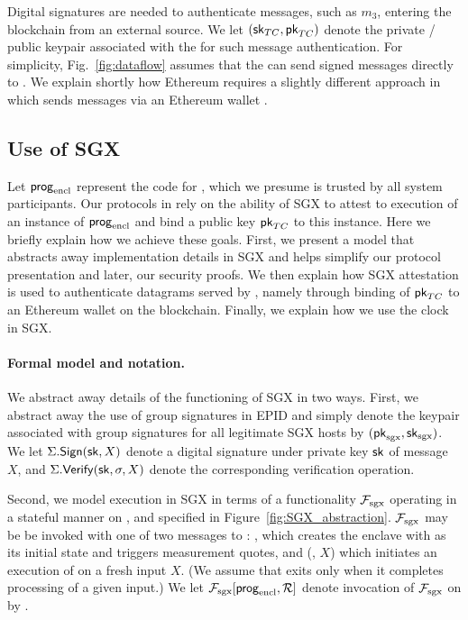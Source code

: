 Digital signatures are needed to authenticate messages, such as $m_3$, entering the blockchain from an external source. We let $({\sf sk}_{TC}, {\sf pk}_{TC})$ denote the private / public keypair associated with the \encname for such message authentication. For simplicity, Fig.~\ref{fig:dataflow} assumes that the \encname can send signed messages directly to \tcont. We explain shortly how Ethereum requires a slightly different approach in which \tc sends messages via an Ethereum wallet \tcadd.


\subsection{Use of SGX}

Let ${\sf prog}_{\textrm{encl}}$ represent the code for \encname, which we presume is trusted by all system participants. Our protocols in \tc rely on the ability of SGX to attest to execution of an instance of ${\sf prog}_{\textrm{encl}}$ and bind a public key ${\sf pk}_{TC}$ to this instance. Here we briefly explain how we achieve these goals. First, we present a model that abstracts away implementation details in SGX and helps simplify our protocol presentation and later, our security proofs.  We then explain how SGX attestation is used to authenticate datagrams served by \tcont, namely through binding of ${\sf pk}_{TC}$ to an Ethereum wallet on the blockchain. Finally, we explain how we use the clock in SGX.



\paragraph{\bf Formal model and notation.} 

We abstract away details of the functioning of SGX in two ways.
First, we abstract away the use of group signatures in EPID and simply denote the keypair associated with group signatures for all legitimate SGX hosts by $({\sf pk}_{\mathrm{sgx}}, {\sf sk}_{\mathrm{sgx}})$. 
We let $\Sigma.{\sf Sign}({{\sf sk}}, X)$ denote a digital signature under private key ${\sf sk}$ of message $X$, and $\Sigma.{\sf Verify}({{\sf sk}}, \sigma, X)$ denote the corresponding verification operation. 

Second, we model execution in SGX in terms of a functionality $\mathcal{F}_{\textrm{sgx}}$ operating in a stateful manner on \enclaveprog {}, and specified in Figure~\ref{fig:SGX_abstraction}. $\mathcal{F}_{\textrm{sgx}}$ may be be invoked with one of two messages to \enclaveprog : \initcall, which creates the enclave with \enclaveprog as its initial state and triggers measurement quotes, and (\resumecall, $X$) which initiates an execution of \enclaveprog on a fresh input $X$. (We assume that \enclaveprog exits only when it completes processing of a given input.) We let $\mathcal{F}_{\textrm{sgx}}[{\sf prog}_{\textrm{encl}}, \mathcal{R}]$ denote invocation of $\mathcal{F}_{\textrm{sgx}}$ on \enclaveprog by \relay. 


